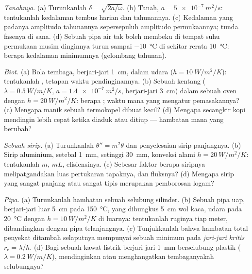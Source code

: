 \begin{exercise}[$\star\star$]\label{exo:b2:heat-conduction:6}
\emph{Tanahnya.} (a) Turunkanlah $\delta = \sqrt{2a/\omega}$. (b) Tanah,
$a = \qty{5e-7}{m^2/s}$: tentukanlah kedalaman tembus harian dan tahunannya. (c) Kedalaman
yang padanya amplitudo tahunannya sepersepuluh amplitudo permukaannya; tunda fasenya
di sana. (d) Sebuah pipa air tak boleh membeku di tempat suhu permukaan
musim dinginnya turun sampai \qty{-10}{\celsius} di sekitar rerata
\qty{10}{\celsius}: berapa kedalaman minimumnya (gelombang tahunan).
\end{exercise}

\begin{exercise}[$\star\star$]\label{exo:b2:heat-conduction:7}
\emph{Biot.} (a) Bola tembaga, berjari-jari \qty{1}{cm}, dalam udara ($h =
\qty{10}{W/m^2/K}$): tentukanlah , tetapan waktu pendinginannya. (b) Sebuah
kentang ($\lambda = \qty{0.5}{W/m/K}$, $a = \qty{1.4e-7}{m^2/s}$, berjari-jari
\qty{3}{cm}) dalam sebuah oven dengan $h = \qty{20}{W/m^2/K}$: berapa ; waktu
mana yang mengatur pemasakannya? (c) Mengapa manik sebuah termokopel dibuat kecil?
(d) Mengapa secangkir kopi mendingin lebih cepat ketika diaduk atau ditiup ---
hambatan mana yang berubah?
\end{exercise}

\begin{exercise}[$\star\star$]\label{exo:b2:heat-conduction:8}
\emph{Sebuah sirip.} (a) Turunkanlah $\theta'' = m^2\theta$ dan penyelesaian sirip panjangnya.
(b) Sirip aluminium, setebal \qty{1}{mm}, setinggi \qty{30}{mm}, konveksi
alami $h = \qty{20}{W/m^2/K}$: tentukanlah $m$, $mL$, efisiensinya. (c) Sebesar faktor
berapa siripnya melipatgandakan luas pertukaran tapaknya, dan
fluksnya? (d) Mengapa sirip yang sangat panjang atau sangat tipis merupakan pemborosan logam?
\end{exercise}

\begin{exercise}[$\star\star$]\label{exo:b2:heat-conduction:9}
\emph{Pipa.} (a) Turunkanlah hambatan sebuah selubung silinder. (b) Sebuah
pipa uap, berjari-jari luar \qty{5}{cm} pada \qty{150}{\celsius}, yang dibungkus
\qty{5}{cm} wol kaca, udara pada \qty{20}{\celsius} dengan $h =
\qty{10}{W/m^2/K}$ di luarnya: tentukanlah ruginya tiap meter, dibandingkan dengan pipa telanjangnya.
(c) Tunjukkanlah bahwa hambatan total penyekat ditambah selaputnya mempunyai sebuah
minimum pada \emph{jari-jari kritis} $r_{\text{c}} = \lambda/h$. (d) Bagi sebuah
kawat listrik berjari-jari \qty{1}{mm} berselubung plastik ($\lambda =
\qty{0.2}{W/m/K}$), mendinginkan atau menghangatkan tembaganyakah selubungnya?
\end{exercise}


